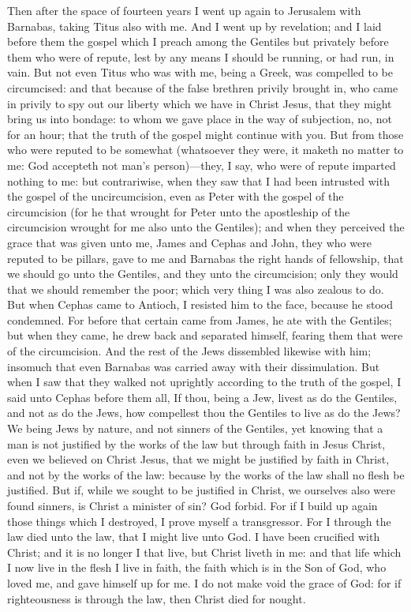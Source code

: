 Then after the space of fourteen years I went up again to Jerusalem with Barnabas, taking Titus also with me. And I went up by revelation; and I laid before them the gospel which I preach among the Gentiles but privately before them who were of repute, lest by any means I should be running, or had run, in vain. But not even Titus who was with me, being a Greek, was compelled to be circumcised: and that because of the false brethren privily brought in, who came in privily to spy out our liberty which we have in Christ Jesus, that they might bring us into bondage: to whom we gave place in the way of subjection, no, not for an hour; that the truth of the gospel might continue with you. But from those who were reputed to be somewhat (whatsoever they were, it maketh no matter to me: God accepteth not man’s person)—they, I say, who were of repute imparted nothing to me: but contrariwise, when they saw that I had been intrusted with the gospel of the uncircumcision, even as Peter with the gospel of the circumcision (for he that wrought for Peter unto the apostleship of the circumcision wrought for me also unto the Gentiles); and when they perceived the grace that was given unto me, James and Cephas and John, they who were reputed to be pillars, gave to me and Barnabas the right hands of fellowship, that we should go unto the Gentiles, and they unto the circumcision; only they would that we should remember the poor; which very thing I was also zealous to do.  But when Cephas came to Antioch, I resisted him to the face, because he stood condemned. For before that certain came from James, he ate with the Gentiles; but when they came, he drew back and separated himself, fearing them that were of the circumcision. And the rest of the Jews dissembled likewise with him; insomuch that even Barnabas was carried away with their dissimulation. But when I saw that they walked not uprightly according to the truth of the gospel, I said unto Cephas before them all, If thou, being a Jew, livest as do the Gentiles, and not as do the Jews, how compellest thou the Gentiles to live as do the Jews? We being Jews by nature, and not sinners of the Gentiles, yet knowing that a man is not justified by the works of the law but through faith in Jesus Christ, even we believed on Christ Jesus, that we might be justified by faith in Christ, and not by the works of the law: because by the works of the law shall no flesh be justified. But if, while we sought to be justified in Christ, we ourselves also were found sinners, is Christ a minister of sin? God forbid. For if I build up again those things which I destroyed, I prove myself a transgressor. For I through the law died unto the law, that I might live unto God. I have been crucified with Christ; and it is no longer I that live, but Christ liveth in me: and that life which I now live in the flesh I live in faith, the faith which is in the Son of God, who loved me, and gave himself up for me. I do not make void the grace of God: for if righteousness is through the law, then Christ died for nought. 
